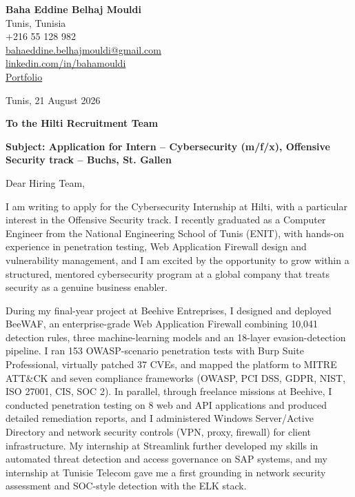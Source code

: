 \documentclass[a4paper,11pt]{article}
\begin{document}
\begin{flushright}
{\bfseries Baha Eddine Belhaj Mouldi}\\
Tunis, Tunisia\\
+216 55 128 982\\
\href{mailto:bahaeddine.belhajmouldi@gmail.com}{bahaeddine.belhajmouldi@gmail.com}\\
\href{https://linkedin.com/in/bahamouldi}{linkedin.com/in/bahamouldi}\\
\href{https://bahamouldi.github.io/portfolio/}{Portfolio}
\end{flushright}

\vspace{0.8cm}

\begin{flushleft}
Tunis, 21 August 2026

\vspace{0.8cm}

{\bfseries To the Hilti Recruitment Team}

\vspace{0.6cm}

{\bfseries Subject: Application for Intern -- Cybersecurity (m/f/x), Offensive Security track -- Buchs, St. Gallen}
\end{flushleft}

\vspace{0.6cm}

Dear Hiring Team,

\vspace{0.4cm}

I am writing to apply for the Cybersecurity Internship at Hilti, with a particular interest in the Offensive Security track. I recently graduated as a Computer Engineer from the National Engineering School of Tunis (ENIT), with hands-on experience in penetration testing, Web Application Firewall design and vulnerability management, and I am excited by the opportunity to grow within a structured, mentored cybersecurity program at a global company that treats security as a genuine business enabler.

During my final-year project at Beehive Entreprises, I designed and deployed BeeWAF, an enterprise-grade Web Application Firewall combining 10,041 detection rules, three machine-learning models and an 18-layer evasion-detection pipeline. I ran 153 OWASP-scenario penetration tests with Burp Suite Professional, virtually patched 37 CVEs, and mapped the platform to MITRE ATT\&CK and seven compliance frameworks (OWASP, PCI DSS, GDPR, NIST, ISO 27001, CIS, SOC 2). In parallel, through freelance missions at Beehive, I conducted penetration testing on 8 web and API applications and produced detailed remediation reports, and I administered Windows Server/Active Directory and network security controls (VPN, proxy, firewall) for client infrastructure. My internship at Streamlink further developed my skills in automated threat detection and access governance on SAP systems, and my internship at Tunisie Telecom gave me a first grounding in network security assessment and SOC-style detection with the ELK stack.
\end{document}
